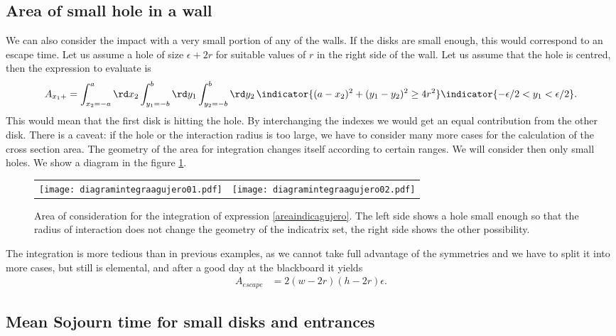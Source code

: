 \subsection{Area of small hole in a wall}

We can also consider the impact with a very small portion of any of the
walls. If the disks are small enough, this would correspond to an escape time. 
Let us assume a hole of size $\epsilon+2r$ for suitable values of $r$ in
the right side of the wall. Let us assume that the hole is
centred, then the expression to evaluate is
\begin{equation}\label{areaindicagujero}
 A_{x_1+} =  \int_{x_2 = -a}^a \rd x_2 
\int_{y_1 = -b}^b \rd y_1 \int_{y_2 = -b}^b \rd y_2 \, \indicator{ (a-x_2)^2 + (y_1-y_2)^2 \ge 4 r^2 }\indicator{ -\epsilon/2<y_1< \epsilon/2}.
\end{equation}
This would mean that the first disk is hitting the hole. By interchanging the
indexes we would get an equal contribution from the other disk. There is a caveat: 
if the hole or the interaction radius is too large, we have to consider many
more cases for the calculation of the cross section area. The geometry of
the area for integration changes itself according to certain ranges.
We will consider then only small holes. We show a diagram 
in the figure \ref{diagintagu}.
\begin{figure}
\centering
\begin{tabular}{cc}
\texttt{[image: diagramintegraagujero01.pdf]} &
\texttt{[image: diagramintegraagujero02.pdf]}
\end{tabular}
\caption{Area of consideration for the integration of expression
 \ref{areaindicagujero}. The left side shows a hole small enough
so that the radius of interaction does not change the geometry of the
indicatrix set, the right side shows the other possibility.}\label{diagintagu}
\end{figure}
The integration is more tedious than in previous examples, as we cannot
take full advantage of the symmetries and we have to split it into
more cases, but still is elemental, and after a good day at the blackboard
it yields
\begin{align}\label{escape}
 A_{escape} &= 2 (w-2r) (h-2r) \epsilon.
\end{align}


\subsection{Mean Sojourn  time for small disks and entrances}

